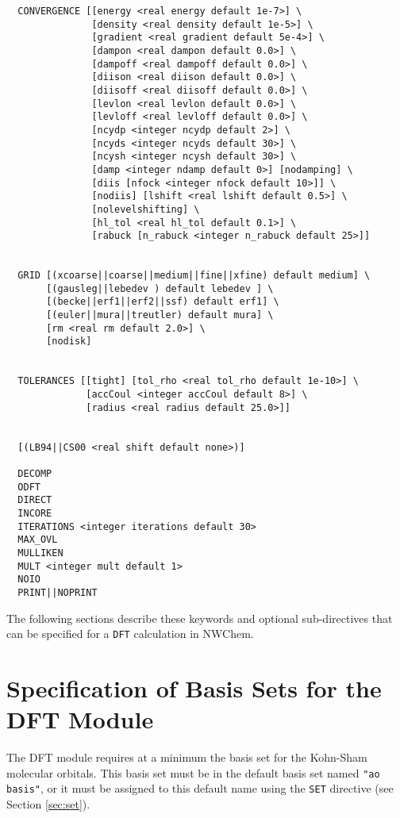 \begin{verbatim}
  CONVERGENCE [[energy <real energy default 1e-7>] \
               [density <real density default 1e-5>] \
               [gradient <real gradient default 5e-4>] \
               [dampon <real dampon default 0.0>] \
               [dampoff <real dampoff default 0.0>] \
               [diison <real diison default 0.0>] \
               [diisoff <real diisoff default 0.0>] \
               [levlon <real levlon default 0.0>] \
               [levloff <real levloff default 0.0>] \
               [ncydp <integer ncydp default 2>] \
               [ncyds <integer ncyds default 30>] \
               [ncysh <integer ncysh default 30>] \
               [damp <integer ndamp default 0>] [nodamping] \
               [diis [nfock <integer nfock default 10>]] \
               [nodiis] [lshift <real lshift default 0.5>] \
               [nolevelshifting] \
               [hl_tol <real hl_tol default 0.1>] \
               [rabuck [n_rabuck <integer n_rabuck default 25>]]


  GRID [(xcoarse||coarse||medium||fine||xfine) default medium] \
       [(gausleg||lebedev ) default lebedev ] \
       [(becke||erf1||erf2||ssf) default erf1] \
       [(euler||mura||treutler) default mura] \
       [rm <real rm default 2.0>] \
       [nodisk]
        

  TOLERANCES [[tight] [tol_rho <real tol_rho default 1e-10>] \
              [accCoul <integer accCoul default 8>] \
              [radius <real radius default 25.0>]]


  [(LB94||CS00 <real shift default none>)]

  DECOMP
  ODFT
  DIRECT
  INCORE
  ITERATIONS <integer iterations default 30>
  MAX_OVL
  MULLIKEN
  MULT <integer mult default 1>
  NOIO
  PRINT||NOPRINT
\end{verbatim}

The following 
sections describe these keywords and
optional sub-directives that can be specified for a \verb+DFT+ calculation
in NWChem.

\section{Specification of Basis Sets for the DFT Module}

The DFT module requires at a minimum the basis set for the Kohn-Sham 
molecular orbitals.  This basis set must be in the default basis set named
{\tt "ao basis"}, or it must be assigned to this default name using the
\verb+SET+ directive (see Section \ref{sec:set}).

